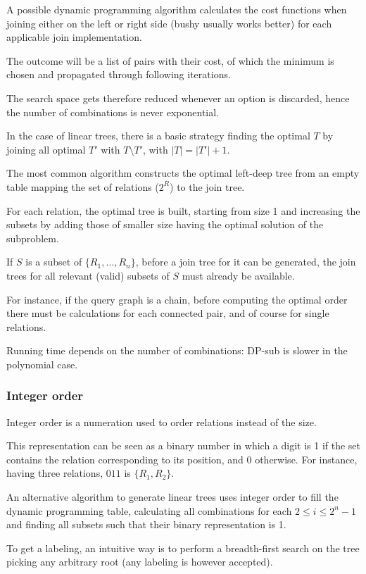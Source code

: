 A possible dynamic programming algorithm calculates the cost functions when joining either on the left or right side (bushy usually works better) for each applicable join implementation. 

The outcome will be a list of pairs with their cost, of which the minimum is chosen and propagated through following iterations.

The search space gets therefore reduced whenever an option is discarded, hence the number of combinations is never exponential.

In the case of linear trees, there is a basic strategy finding the optimal $T$ by joining all optimal $T'$ with $T \setminus T'$, with $|T| = |T'| + 1$.

The most common algorithm constructs the optimal left-deep tree from an empty table mapping the set of relations ($2^R$) to the join tree. 

For each relation, the optimal tree is built, starting from size 1 and increasing the subsets by adding those of smaller size having the optimal solution of the subproblem.

If $S$ is a subset of $\{R_1, \dots, R_n\}$, before a join tree for it can be generated, the join trees for all relevant (valid) subsets of $S$ must already be available.

For instance, if the query graph is a chain, before computing the optimal order there must be calculations for each connected pair, and of course for single relations.

Running time depends on the number of combinations: DP-sub is slower in the polynomial case.

\subsubsection{Integer order}
Integer order is a numeration used to order relations instead of the size.

This representation can be seen as a binary number in which a digit is 1 if the set contains the relation corresponding to its position, and 0 otherwise. For instance, having three relations, $011$ is $\{R_1, R_2\}$.

An alternative algorithm to generate linear trees uses integer order to fill the dynamic programming table, calculating all combinations for each $2 \leq i \leq 2^n-1$ and finding all subsets such that their binary representation is 1.

To get a labeling, an intuitive way is to perform a breadth-first search on the tree picking any arbitrary root (any labeling is however accepted).

